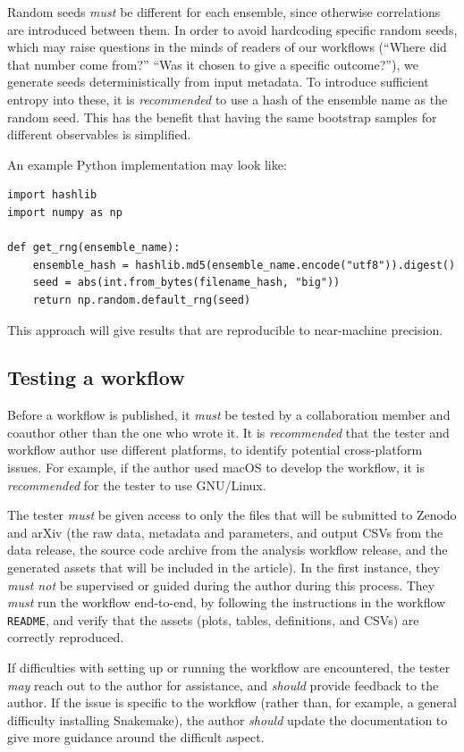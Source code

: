 \documentclass{article}
\newcommand\rfcword[1]{\emph{#1}\xspace}
\newcommand\must{\rfcword{must}}
\newcommand\mustnot{\rfcword{must not}}
\newcommand\should{\rfcword{should}}
\newcommand\recommended{\rfcword{recommended}}
\newcommand\may{\rfcword{may}}
\newcommand\filename[1]{\texttt{#1}\xspace}
\newcommand\readme{\filename{README}}
\begin{document}
Random seeds \must be different for each ensemble,
since otherwise correlations are introduced between them.
In order to avoid hardcoding specific random seeds,
which may raise questions in the minds of readers of our workflows
(``Where did that number come from?''
``Was it chosen to give a specific outcome?''),
we generate seeds deterministically from input metadata.
To introduce sufficient entropy into these,
it is \recommended to use a hash of the ensemble name as the random seed.
This has the benefit that
having the same bootstrap samples for different observables is simplified.

An example Python implementation may look like:

\begin{verbatim}
import hashlib
import numpy as np

def get_rng(ensemble_name):
    ensemble_hash = hashlib.md5(ensemble_name.encode("utf8")).digest()
    seed = abs(int.from_bytes(filename_hash, "big"))
    return np.random.default_rng(seed)
\end{verbatim}

This approach will give results that are reproducible to near-machine precision.

\subsection{Testing a workflow}\label{sec:testing}

Before a workflow is published,
it \must be tested by a collaboration member and coauthor other than the one who wrote it.
It is \recommended that the tester and workflow author use different platforms,
to identify potential cross-platform issues.
For example,
if the author used macOS to develop the workflow,
it is \recommended for the tester to use GNU/Linux.

The tester \must be given access to only the files that will be submitted to Zenodo and arXiv
(the raw data, metadata and parameters, and output CSVs from the data release,
the source code archive from the analysis workflow release,
and the generated assets that will be included in the article).
In the first instance,
they \mustnot be supervised or guided during the author during this process.
They \must run the workflow end-to-end,
by following the instructions in the workflow \readme,
and verify that the assets
(plots, tables, definitions, and CSVs)
are correctly reproduced.

If difficulties with setting up or running the workflow are encountered,
the tester \may reach out to the author for assistance,
and \should provide feedback to the author.
If the issue is specific to the workflow
(rather than,
for example,
a general difficulty installing Snakemake),
the author \should update the documentation to give more guidance around the difficult aspect.
\end{document}
